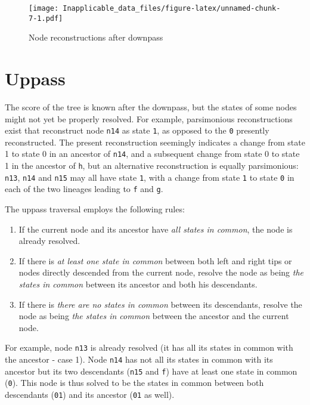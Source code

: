\documentclass[]{book}
\providecommand{\tightlist}{%
  \setlength{\itemsep}{0pt}\setlength{\parskip}{0pt}}
\theoremstyle{definition}
\theoremstyle{definition}
\theoremstyle{definition}
\theoremstyle{remark}
\begin{document}
\begin{figure}
\centering
\texttt{[image: Inapplicable\_data\_files/figure-latex/unnamed-chunk-7-1.pdf]}
\caption{\label{fig:unnamed-chunk-7}Node reconstructions after downpass}
\end{figure}

\hypertarget{uppass}{%
\section{Uppass}\label{uppass}}

The score of the tree is known after the downpass, but the states of
some nodes might not yet be properly resolved. For example, parsimonious
reconstructions exist that reconstruct node \texttt{n14} as state
\texttt{1}, as opposed to the \texttt{0} presently reconstructed. The
present reconstruction seemingly indicates a change from state 1 to
state 0 in an ancestor of \texttt{n14}, and a subsequent change from
state 0 to state 1 in the ancestor of \texttt{h}, but an alternative
reconstruction is equally parsimonious: \texttt{n13}, \texttt{n14} and
\texttt{n15} may all have state \texttt{1}, with a change from state
\texttt{1} to state \texttt{0} in each of the two lineages leading to
\texttt{f} and \texttt{g}.

The uppass traversal employs the following rules:

\begin{enumerate}
\def\labelenumi{\arabic{enumi}.}
\tightlist
\item
  If the current node and its ancestor have \emph{all states in common},
  the node is already resolved.
\item
  If there is \emph{at least one state in common} between both left and
  right tips or nodes directly descended from the current node, resolve
  the node as being \emph{the states in common} between its ancestor and
  both his descendants.
\item
  If there is \emph{there are no states in common} between its
  descendants, resolve the node as being \emph{the states in common}
  between the ancestor and the current node.
\end{enumerate}

For example, node \texttt{n13} is already resolved (it has all its
states in common with the ancestor - case 1). Node \texttt{n14} has not
all its states in common with its ancestor but its two descendants
(\texttt{n15} and \texttt{f}) have at least one state in common
(\texttt{0}). This node is thus solved to be the states in common
between both descendants (\texttt{01}) and its ancestor (\texttt{01} as
well).
\end{document}
